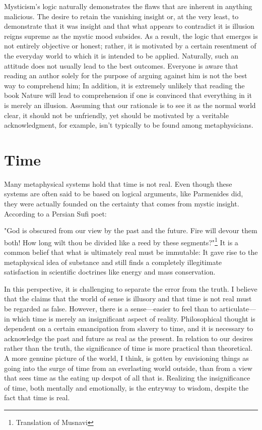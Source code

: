 \documentclass[a4paper,12pt]{book}[2004/02/16]
\theoremstyle{ilemma}
\theoremstyle{itheorem}
\theoremstyle{iother}
\theoremstyle{icorollary}
\theoremstyle{numcorollary}
\theoremstyle{idefinition}
\begin{document}
Mysticism's logic naturally demonstrates the flaws that are inherent in anything malicious. The desire to retain the vanishing insight or, at the very least, to demonstrate that it was insight and that what appears to contradict it is illusion reigns supreme as the mystic mood subsides. As a result, the logic that emerges is not entirely objective or honest; rather, it is motivated by a certain resentment of the everyday world to which it is intended to be applied. Naturally, such an attitude does not usually lead to the best outcomes. Everyone is aware that reading an author solely for the purpose of arguing against him is not the best way to comprehend him; In addition, it is extremely unlikely that reading the book Nature will lead to comprehension if one is convinced that everything in it is merely an illusion. Assuming that our rationale is to see it as the normal
world clear, it should not be unfriendly, yet should be motivated by a
veritable acknowledgment, for example, isn't typically to be found among
metaphysicians.

\section{Time}
Many metaphysical systems hold that time is not real. Even though these systems are often said to be based on logical arguments, like Parmenides did, they were actually founded on the certainty that comes from mystic insight. According to a Persian Sufi poet:

    "God is obscured from our view by the past and the future.
    Fire will devour them both! How long wilt thou be divided like a reed by these segments?"\footnote{Translation of Musnavi} It is a common belief that what is ultimately real must be immutable: It gave rise to the metaphysical idea of substance and still finds a completely illegitimate satisfaction in scientific doctrines like energy and mass conservation.

In this perspective, it is challenging to separate the error from the truth.
I believe that the claims that the world of sense is illusory and that time is not real must be regarded as false.
However, there is a sense—easier to feel than to articulate—in which time is merely an insignificant aspect of reality. Philosophical thought is dependent on a certain emancipation from slavery to time, and it is necessary to acknowledge the past and future as real as the present. In relation to our desires rather than the truth, the significance of time is more practical than theoretical. A more genuine picture of the world, I think, is gotten by
envisioning things as going into the surge of time from an everlasting
world outside, than from a view that sees time as the eating up
despot of all that is. Realizing the insignificance of time, both mentally and emotionally, is the entryway to wisdom, despite the fact that time is real.
\end{document}
